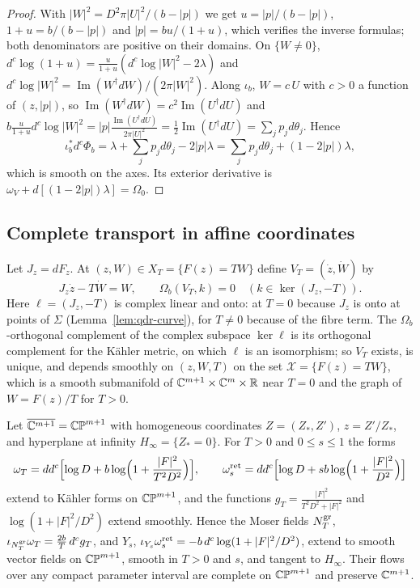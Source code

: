 \begin{proof}
With $|W|^2=D^2\pi|U|^2/(b-|p|)$ we get $u=|p|/(b-|p|)$, $1+u=b/(b-|p|)$ and $|p|=bu/(1+u)$, which verifies the inverse formulas;
both denominators are positive on their domains. On $\{W\ne0\}$, $d^c\log(1+u)=\frac u{1+u}(d^c\log|W|^2-2\lambda)$ and
$d^c\log|W|^2=\operatorname{Im}(W^\dagger dW)/(2\pi|W|^2)$. Along $\iota_b$, $W=c\,U$ with $c>0$ a function of $(z,|p|)$, so
$\operatorname{Im}(W^\dagger dW)=c^2\operatorname{Im}(U^\dagger dU)$ and $b\frac
u{1+u}d^c\log|W|^2=|p|\frac{\operatorname{Im}(U^\dagger dU)}{2\pi|U|^2} =\frac12\operatorname{Im}(U^\dagger dU)=\sum_jp_jd\theta_j$.
Hence
\[
 \iota_b^*d^c\Phi_b=\lambda+\sum_jp_jd\theta_j-2|p|\lambda=\sum_jp_jd\theta_j+(1-2|p|)\lambda ,
\]
which is smooth on the axes. Its exterior derivative is $\omega_V+d[(1-2|p|)\lambda]=\Omega_0$.
\end{proof}

\subsection{Complete transport in affine coordinates}\label{sec:vtr-transport}

Let $J_z=dF_z$. At $(z,W)\in X_T=\{F(z)=TW\}$ define $V_T=(\dot z,\dot W)$ by
\begin{equation}\label{eq:vtr-transport}
 J_z\dot z-T\dot W=W,\qquad
 \Omega_b(V_T,k)=0\quad(k\in\ker(J_z,-T)).
\end{equation}
Here $\ell=(J_z,-T)$ is complex linear and onto: at $T=0$ because $J_z$ is onto at points of $\Sigma$ (Lemma~\ref{lem:qdr-curve}),
for $T\ne0$ because of the fibre term. The $\Omega_b$-orthogonal complement of the complex subspace $\ker\ell$ is its orthogonal
complement for the Kähler metric, on which $\ell$ is an isomorphism; so $V_T$ exists, is unique, and depends smoothly on $(z,W,T)$
on the set $\mathcal X=\{F(z)=TW\}$, which is a smooth submanifold of $\mathbb{C}^{m+1}\times\mathbb{C}^m\times\mathbb{R}$ near $T=0$ and the graph of
$W=F(z)/T$ for $T>0$.

\begin{lemma}\label{lem:vtr-affine-growth}
Let $\overline{\mathbb{C}^{m+1}}=\mathbb{CP}^{m+1}$ with homogeneous coordinates $Z=(Z_*,Z')$, $z=Z'/Z_*$, and hyperplane at infinity
$H_\infty=\{Z_*=0\}$. For $T>0$ and $0\le s\le1$ the forms
\[
 \omega_T=dd^c\Bigl[\log D+b\log\Bigl(1+\frac{|F|^2}{T^2D^2}\Bigr)\Bigr],\qquad
 \omega^{\rm ret}_s=dd^c\Bigl[\log D+sb\log\Bigl(1+\frac{|F|^2}{D^2}\Bigr)\Bigr]
\]
extend to Kähler forms on $\mathbb{CP}^{m+1}$, and the functions $g_T=\frac{|F|^2}{T^2D^2+|F|^2}$ and $\log(1+|F|^2/D^2)$ extend smoothly.
Hence the Moser fields $N^{\rm gr}_T$, $\iota_{N^{\rm gr}_T}\omega_T=\frac{2b}T\,d^cg_T$, and $Y_s$, $\iota_{Y_s}\omega^{\rm
ret}_s=-b\,d^c\log(1+|F|^2/D^2)$, extend to smooth vector fields on $\mathbb{CP}^{m+1}$, smooth in $T>0$ and $s$, and tangent to $H_\infty$.
Their flows over any compact parameter interval are complete on $\mathbb{CP}^{m+1}$ and preserve $\mathbb{C}^{m+1}$.
\end{lemma}

